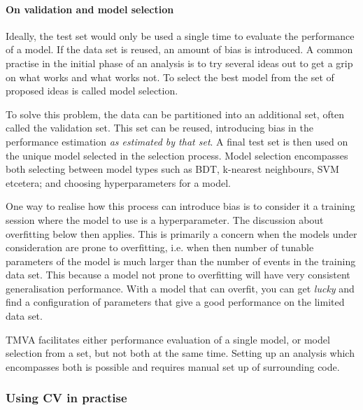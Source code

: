\paragraph{On validation and model selection}
Ideally, the test set would only be used a single time to evaluate the performance of a model. If the data set is reused, an amount of bias is introduced. A common practise in the initial phase of an analysis is to try several ideas out to get a grip on what works and what works not. To select the best model from the set of proposed ideas is called model selection.

To solve this problem, the data can be partitioned into an additional set, often called the validation set. This set can be reused, introducing bias in the performance estimation \emph{as estimated by that set}. A final test set is then used on the unique model selected in the selection process.
Model selection encompasses both selecting between model types such as BDT, k-nearest neighbours, SVM etcetera; and choosing hyperparameters for a model.

One way to realise how this process can introduce bias is to consider it a training session where the model to use is a hyperparameter. The discussion about overfitting below then applies.
This is primarily a concern when the models under consideration are prone to overfitting, i.e. when then number of tunable parameters of the model is much larger than the number of events in the training data set. This because a model not prone to overfitting will have very consistent generalisation performance. With a model that can overfit, you can get \emph{lucky} and find a configuration of parameters that give a good performance on the limited data set.

TMVA facilitates either performance evaluation of a single model, or model selection from a set, but not both at the same time. Setting up an analysis which encompasses both is possible and requires manual set up of surrounding code.







\subsubsection{Using CV in practise}
\label{sec:cv-performace-estimation-methods}

